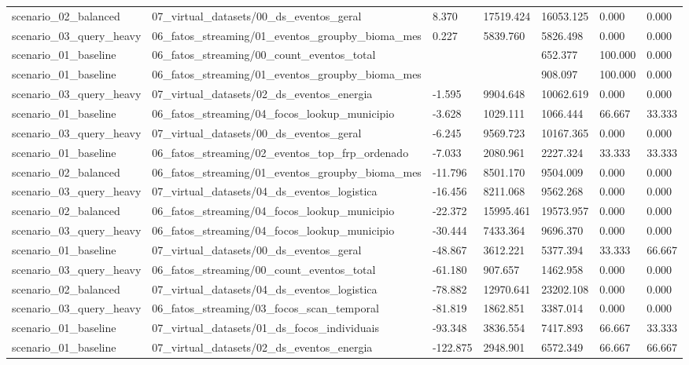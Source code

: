 {\begin{longtable}{p{}p{}p{}p{}p{}p{}p{}}
scenario\_02\_balanced & 07\_virtual\_datasets/00\_ds\_eventos\_geral & 8.370 & 17519.424 & 16053.125 & 0.000 & 0.000 \\
scenario\_03\_query\_heavy & 06\_fatos\_streaming/01\_eventos\_groupby\_bioma\_mes & 0.227 & 5839.760 & 5826.498 & 0.000 & 0.000 \\
scenario\_01\_baseline & 06\_fatos\_streaming/00\_count\_eventos\_total &  &  & 652.377 & 100.000 & 0.000 \\
scenario\_01\_baseline & 06\_fatos\_streaming/01\_eventos\_groupby\_bioma\_mes &  &  & 908.097 & 100.000 & 0.000 \\
scenario\_03\_query\_heavy & 07\_virtual\_datasets/02\_ds\_eventos\_energia & -1.595 & 9904.648 & 10062.619 & 0.000 & 0.000 \\
scenario\_01\_baseline & 06\_fatos\_streaming/04\_focos\_lookup\_municipio & -3.628 & 1029.111 & 1066.444 & 66.667 & 33.333 \\
scenario\_03\_query\_heavy & 07\_virtual\_datasets/00\_ds\_eventos\_geral & -6.245 & 9569.723 & 10167.365 & 0.000 & 0.000 \\
scenario\_01\_baseline & 06\_fatos\_streaming/02\_eventos\_top\_frp\_ordenado & -7.033 & 2080.961 & 2227.324 & 33.333 & 33.333 \\
scenario\_02\_balanced & 06\_fatos\_streaming/01\_eventos\_groupby\_bioma\_mes & -11.796 & 8501.170 & 9504.009 & 0.000 & 0.000 \\
scenario\_03\_query\_heavy & 07\_virtual\_datasets/04\_ds\_eventos\_logistica & -16.456 & 8211.068 & 9562.268 & 0.000 & 0.000 \\
scenario\_02\_balanced & 06\_fatos\_streaming/04\_focos\_lookup\_municipio & -22.372 & 15995.461 & 19573.957 & 0.000 & 0.000 \\
scenario\_03\_query\_heavy & 06\_fatos\_streaming/04\_focos\_lookup\_municipio & -30.444 & 7433.364 & 9696.370 & 0.000 & 0.000 \\
scenario\_01\_baseline & 07\_virtual\_datasets/00\_ds\_eventos\_geral & -48.867 & 3612.221 & 5377.394 & 33.333 & 66.667 \\
scenario\_03\_query\_heavy & 06\_fatos\_streaming/00\_count\_eventos\_total & -61.180 & 907.657 & 1462.958 & 0.000 & 0.000 \\
scenario\_02\_balanced & 07\_virtual\_datasets/04\_ds\_eventos\_logistica & -78.882 & 12970.641 & 23202.108 & 0.000 & 0.000 \\
scenario\_03\_query\_heavy & 06\_fatos\_streaming/03\_focos\_scan\_temporal & -81.819 & 1862.851 & 3387.014 & 0.000 & 0.000 \\
scenario\_01\_baseline & 07\_virtual\_datasets/01\_ds\_focos\_individuais & -93.348 & 3836.554 & 7417.893 & 66.667 & 33.333 \\
scenario\_01\_baseline & 07\_virtual\_datasets/02\_ds\_eventos\_energia & -122.875 & 2948.901 & 6572.349 & 66.667 & 66.667 \\
\bottomrule
\end{longtable}
}
